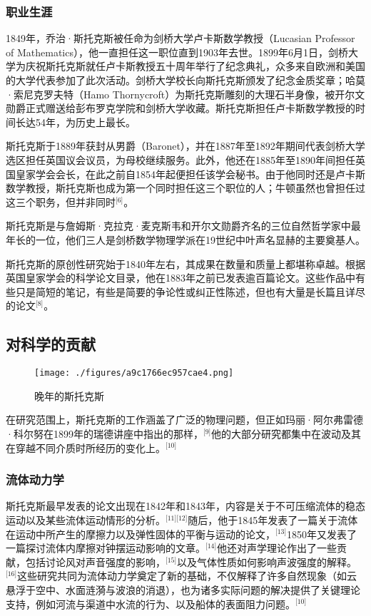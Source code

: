 \subsubsection{职业生涯}
1849年，乔治·斯托克斯被任命为剑桥大学卢卡斯数学教授（Lucasian Professor of Mathematics），他一直担任这一职位直到1903年去世。1899年6月1日，剑桥大学为庆祝斯托克斯就任卢卡斯教授五十周年举行了纪念典礼，众多来自欧洲和美国的大学代表参加了此次活动。剑桥大学校长向斯托克斯颁发了纪念金质奖章；哈莫·索尼克罗夫特（Hamo Thornycroft）为斯托克斯雕刻的大理石半身像，被开尔文勋爵正式赠送给彭布罗克学院和剑桥大学收藏。斯托克斯担任卢卡斯数学教授的时间长达54年，为历史上最长。

斯托克斯于1889年获封从男爵（Baronet），并在1887年至1892年期间代表剑桥大学选区担任英国议会议员，为母校继续服务。此外，他还在1885年至1890年间担任英国皇家学会会长，在此之前自1854年起便担任该学会秘书。由于他同时还是卢卡斯数学教授，斯托克斯也成为第一个同时担任这三个职位的人；牛顿虽然也曾担任过这三个职务，但并非同时\(^\text{[6]}\)。

斯托克斯是与詹姆斯·克拉克·麦克斯韦和开尔文勋爵齐名的三位自然哲学家中最年长的一位，他们三人是剑桥数学物理学派在19世纪中叶声名显赫的主要奠基人。

斯托克斯的原创性研究始于1840年左右，其成果在数量和质量上都堪称卓越。根据英国皇家学会的科学论文目录，他在1883年之前已发表逾百篇论文。这些作品中有些只是简短的笔记，有些是简要的争论性或纠正性陈述，但也有大量是长篇且详尽的论文\(^\text{[8]}\)。
\subsection{对科学的贡献}
\begin{figure}[ht]
\centering
\texttt{[image: ./figures/a9c1766ec957cae4.png]}
\caption{晚年的斯托克斯} \label{fig_QZstks_2}
\end{figure}
在研究范围上，斯托克斯的工作涵盖了广泛的物理问题，但正如玛丽·阿尔弗雷德·科尔努在1899年的瑞德讲座中指出的那样，\(^\text{[9]}\)他的大部分研究都集中在波动及其在穿越不同介质时所经历的变化上。\(^\text{[10]}\)
\subsubsection{流体动力学}
斯托克斯最早发表的论文出现在1842年和1843年，内容是关于不可压缩流体的稳态运动以及某些流体运动情形的分析。\(^\text{[11][12]}\)随后，他于1845年发表了一篇关于流体在运动中所产生的摩擦力以及弹性固体的平衡与运动的论文，\(^\text{[13]}\)1850年又发表了一篇探讨流体内摩擦对钟摆运动影响的文章。\(^\text{[14]}\)他还对声学理论作出了一些贡献，包括讨论风对声音强度的影响，\(^\text{[15]}\)以及气体性质如何影响声波强度的解释。\(^\text{[16]}\)这些研究共同为流体动力学奠定了新的基础，不仅解释了许多自然现象（如云悬浮于空中、水面涟漪与波浪的消退），也为诸多实际问题的解决提供了关键理论支持，例如河流与渠道中水流的行为、以及船体的表面阻力问题。\(^\text{[10]}\)

